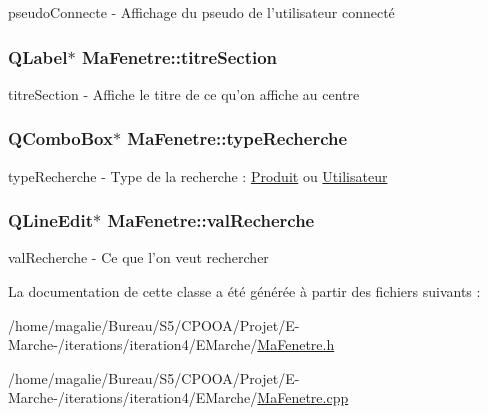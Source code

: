 pseudo\-Connecte -\/ Affichage du pseudo de l'utilisateur connecté 

\hypertarget{class_ma_fenetre_ac4749f9608f7c8d6e5d60434ddbedfc5}{
\subsubsection[{titre\-Section}]{\setlength{\rightskip}{0pt plus 5cm}Q\-Label$\ast$ Ma\-Fenetre\-::titre\-Section\hspace{0.3cm}{\ttfamily [protected]}}}\label{class_ma_fenetre_ac4749f9608f7c8d6e5d60434ddbedfc5}


titre\-Section -\/ Affiche le titre de ce qu'on affiche au centre 

\hypertarget{class_ma_fenetre_a3df6a320b8835369da88bf94b701ae76}{
\subsubsection[{type\-Recherche}]{\setlength{\rightskip}{0pt plus 5cm}Q\-Combo\-Box$\ast$ Ma\-Fenetre\-::type\-Recherche\hspace{0.3cm}{\ttfamily [protected]}}}\label{class_ma_fenetre_a3df6a320b8835369da88bf94b701ae76}


type\-Recherche -\/ Type de la recherche \-: \hyperlink{class_produit}{Produit} ou \hyperlink{class_utilisateur}{Utilisateur} 

\hypertarget{class_ma_fenetre_a37836681a6d48a32dcd379b11447f579}{
\subsubsection[{val\-Recherche}]{\setlength{\rightskip}{0pt plus 5cm}Q\-Line\-Edit$\ast$ Ma\-Fenetre\-::val\-Recherche\hspace{0.3cm}{\ttfamily [protected]}}}\label{class_ma_fenetre_a37836681a6d48a32dcd379b11447f579}


val\-Recherche -\/ Ce que l'on veut rechercher 



La documentation de cette classe a été générée à partir des fichiers suivants \-:\begin{DoxyCompactItemize}
\item 
/home/magalie/\-Bureau/\-S5/\-C\-P\-O\-O\-A/\-Projet/\-E-\/\-Marche-\//iterations/iteration4/\-E\-Marche/\hyperlink{_ma_fenetre_8h}{Ma\-Fenetre.\-h}\item 
/home/magalie/\-Bureau/\-S5/\-C\-P\-O\-O\-A/\-Projet/\-E-\/\-Marche-\//iterations/iteration4/\-E\-Marche/\hyperlink{_ma_fenetre_8cpp}{Ma\-Fenetre.\-cpp}\end{DoxyCompactItemize}
